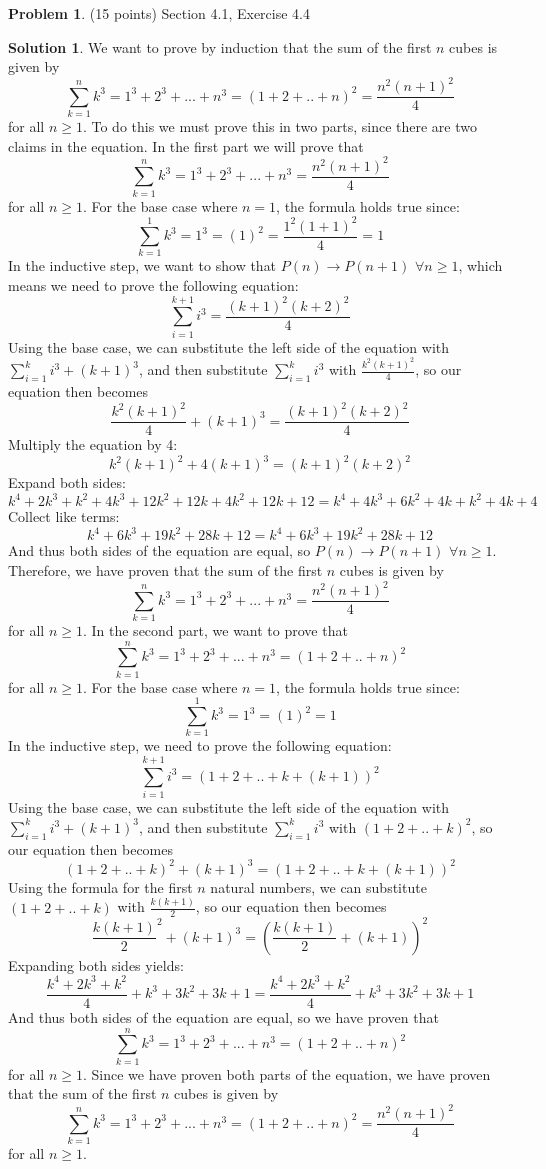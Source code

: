 \documentclass{article}
\theoremstyle{definition}
\newtheorem{problem}{Problem}
\newtheorem*{solution}{Solution}
\begin{document}
\newpage
\begin{problem} (15 points) Section 4.1, Exercise 4.4 
\end{problem}
\begin{solution}
We want to prove by induction that the sum of the first $n$ cubes is given by \[\sum_{k=1}^{n} k^3 = 1^3 + 2^3 + ... + n^3 = (1 + 2 + .. + n)^2 = \frac{n^2 (n+1)^2}{4}\] for all $n\ge1$.
To do this we must prove this in two parts, since there are two claims in the equation.
In the first part we will prove that \[\sum_{k=1}^{n} k^3 = 1^3 + 2^3 + ... + n^3 = \frac{n^{2}(n+1)^{2}}{4}\] for all $n\ge1$.
For the base case where $n=1$, the formula holds true since: \[\sum_{k=1}^{1} k^3 = 1^3 = (1)^2 = \frac{1^2 (1+1)^2}{4} = 1\]
In the inductive step, we want to show that $P(n) \rightarrow P(n+1)$ $\forall n \ge 1$, which means we need to prove the following equation: \[\sum_{i=1}^{k+1} i^{3} = \frac{(k+1)^2 (k+2)^2}{4}\]
Using the base case, we can substitute the left side of the equation with $\sum_{i=1}^{k} i^{3} + (k+1)^{3}$, and then substitute $\sum_{i=1}^{k} i^{3}$ with $\frac{k^2 (k+1)^2}{4}$, so our equation then becomes \[\frac{k^2 (k+1)^2}{4} + (k+1)^{3} = \frac{(k+1)^2 (k+2)^2}{4}\]
Multiply the equation by 4: \[k^2 (k+1)^2 + 4(k+1)^{3} = (k+1)^2 (k+2)^2\]
Expand both sides: \[k^4 + 2k^3 + k^2 + 4k^3 + 12k^2 + 12k + 4k^2 + 12k + 12 = k^4 + 4k^3 + 6k^2 + 4k + k^2 + 4k + 4\]
Collect like terms: \[k^4 + 6k^3 + 19k^2 + 28k + 12 = k^4 + 6k^3 + 19k^2 + 28k + 12\]
And thus both sides of the equation are equal, so $P(n) \rightarrow P(n+1)$ $\forall n \ge 1$.
Therefore, we have proven that the sum of the first $n$ cubes is given by \[\sum_{k=1}^{n} k^3 = 1^3 + 2^3 + ... + n^3 = \frac{n^2 (n+1)^2}{4}\] for all $n\ge1$.
In the second part, we want to prove that \[\sum_{k=1}^{n} k^3 = 1^3 + 2^3 + ... + n^3 = (1 + 2 + .. + n)^2\] for all $n\ge1$.
For the base case where $n=1$, the formula holds true since: \[\sum_{k=1}^{1} k^3 = 1^3 = (1)^2 = 1\]
In the inductive step, we need to prove the following equation: \[\sum_{i=1}^{k+1} i^{3} = (1 + 2 + .. + k + (k+1))^2\]
Using the base case, we can substitute the left side of the equation with $\sum_{i=1}^{k} i^{3} + (k+1)^{3}$, and then substitute $\sum_{i=1}^{k} i^{3}$ with $(1 + 2 + .. + k)^2$, so our equation then becomes \[(1 + 2 + .. + k)^2 + (k+1)^{3} = (1 + 2 + .. + k + (k+1))^2\]
Using the formula for the first $n$ natural numbers, we can substitute $(1 + 2 + .. + k)$ with $\frac{k(k+1)}{2}$, so our equation then becomes \[\frac{k(k+1)}{2}^2 + (k+1)^{3} = (\frac{k(k+1)}{2} + (k+1))^2\]
Expanding both sides yields: \[\frac{k^4 + 2k^3 + k^2}{4} + k^3 + 3k^2 + 3k + 1 = \frac{k^4 + 2k^3 + k^2}{4} + k^3 + 3k^2 + 3k + 1\]
And thus both sides of the equation are equal, so we have proven that \[\sum_{k=1}^{n} k^3 = 1^3 + 2^3 + ... + n^3 = (1 + 2 + .. + n)^2\] for all $n\ge1$.
Since we have proven both parts of the equation, we have proven that the sum of the first $n$ cubes is given by \[\sum_{k=1}^{n} k^3 = 1^3 + 2^3 + ... + n^3 = (1 + 2 + .. + n)^2 = \frac{n^2 (n+1)^2}{4}\] for all $n\ge1$.
\end{solution}
\end{document}
